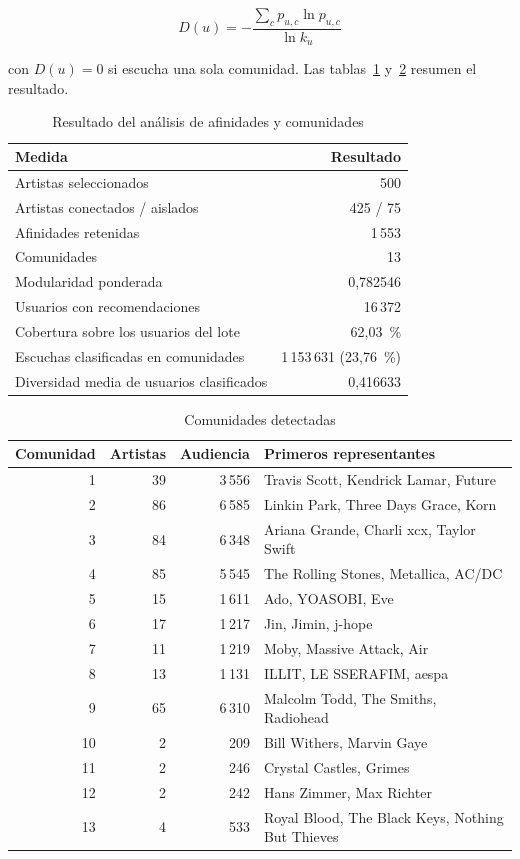 \[
D(u) = -\frac{\sum_{c} p_{u,c} \ln p_{u,c}}{\ln k_u}
\]

con $D(u) = 0$ si escucha una sola comunidad. Las tablas~\ref{tab:neo4j-analisis} y~\ref{tab:neo4j-comunidades} resumen el resultado.

\begin{table}[H]
\centering
\caption{Resultado del análisis de afinidades y comunidades}
\label{tab:neo4j-analisis}
\begin{tabular}{l r}
\toprule
Medida & Resultado \\
\midrule
Artistas seleccionados & 500 \\
Artistas conectados / aislados & 425 / 75 \\
Afinidades retenidas & 1\,553 \\
Comunidades & 13 \\
Modularidad ponderada & 0,782546 \\
Usuarios con recomendaciones & 16\,372 \\
Cobertura sobre los usuarios del lote & 62,03~\% \\
Escuchas clasificadas en comunidades & 1\,153\,631 (23,76~\%) \\
Diversidad media de usuarios clasificados & 0,416633 \\
\bottomrule
\end{tabular}
\end{table}

\begin{table}[H]
\centering
\caption{Comunidades detectadas}
\label{tab:neo4j-comunidades}
\begin{tabular}{r r r l}
\toprule
Comunidad & Artistas & Audiencia & Primeros representantes \\
\midrule
1 & 39 & 3\,556 & Travis Scott, Kendrick Lamar, Future \\
2 & 86 & 6\,585 & Linkin Park, Three Days Grace, Korn \\
3 & 84 & 6\,348 & Ariana Grande, Charli xcx, Taylor Swift \\
4 & 85 & 5\,545 & The Rolling Stones, Metallica, AC/DC \\
5 & 15 & 1\,611 & Ado, YOASOBI, Eve \\
6 & 17 & 1\,217 & Jin, Jimin, j-hope \\
7 & 11 & 1\,219 & Moby, Massive Attack, Air \\
8 & 13 & 1\,131 & ILLIT, LE SSERAFIM, aespa \\
9 & 65 & 6\,310 & Malcolm Todd, The Smiths, Radiohead \\
10 & 2 & 209 & Bill Withers, Marvin Gaye \\
11 & 2 & 246 & Crystal Castles, Grimes \\
12 & 2 & 242 & Hans Zimmer, Max Richter \\
13 & 4 & 533 & Royal Blood, The Black Keys, Nothing But Thieves \\
\bottomrule
\end{tabular}
\end{table}

